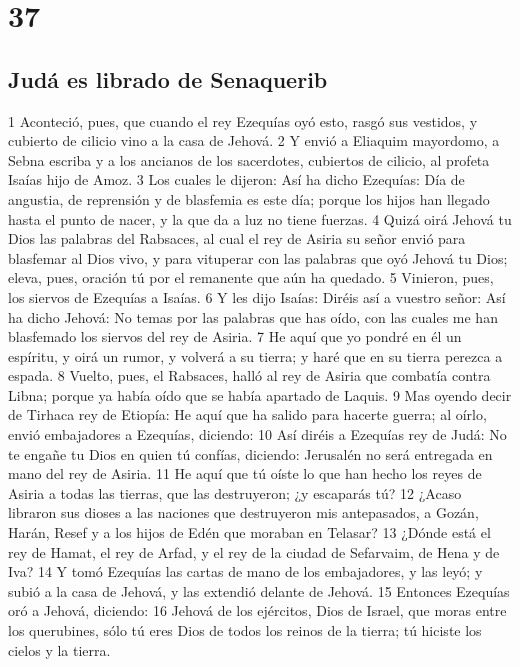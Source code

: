 \chapter{37}

\section*{Judá es librado de Senaquerib}

1 Aconteció, pues, que cuando el rey Ezequías oyó esto, rasgó sus vestidos, y cubierto de cilicio vino a la casa de Jehová.
2 Y envió a Eliaquim mayordomo, a Sebna escriba y a los ancianos de los sacerdotes, cubiertos de cilicio, al profeta Isaías hijo de Amoz.
3 Los cuales le dijeron: Así ha dicho Ezequías: Día de angustia, de reprensión y de blasfemia es este día; porque los hijos han llegado hasta el punto de nacer, y la que da a luz no tiene fuerzas.
4 Quizá oirá Jehová tu Dios las palabras del Rabsaces, al cual el rey de Asiria su señor envió para blasfemar al Dios vivo, y para vituperar con las palabras que oyó Jehová tu Dios; eleva, pues, oración tú por el remanente que aún ha quedado.
5 Vinieron, pues, los siervos de Ezequías a Isaías.
6 Y les dijo Isaías: Diréis así a vuestro señor: Así ha dicho Jehová: No temas por las palabras que has oído, con las cuales me han blasfemado los siervos del rey de Asiria.
7 He aquí que yo pondré en él un espíritu, y oirá un rumor, y volverá a su tierra; y haré que en su tierra perezca a espada.
8 Vuelto, pues, el Rabsaces, halló al rey de Asiria que combatía contra Libna; porque ya había oído que se había apartado de Laquis.
9 Mas oyendo decir de Tirhaca rey de Etiopía: He aquí que ha salido para hacerte guerra; al oírlo, envió embajadores a Ezequías, diciendo:
10 Así diréis a Ezequías rey de Judá: No te engañe tu Dios en quien tú confías, diciendo: Jerusalén no será entregada en mano del rey de Asiria.
11 He aquí que tú oíste lo que han hecho los reyes de Asiria a todas las tierras, que las destruyeron; ¿y escaparás tú?
12 ¿Acaso libraron sus dioses a las naciones que destruyeron mis antepasados, a Gozán, Harán, Resef y a los hijos de Edén que moraban en Telasar?
13 ¿Dónde está el rey de Hamat, el rey de Arfad, y el rey de la ciudad de Sefarvaim, de Hena y de Iva?
14 Y tomó Ezequías las cartas de mano de los embajadores, y las leyó; y subió a la casa de Jehová, y las extendió delante de Jehová. 
15 Entonces Ezequías oró a Jehová, diciendo:
16 Jehová de los ejércitos, Dios de Israel, que moras entre los querubines, sólo tú eres Dios de todos los reinos de la tierra; tú hiciste los cielos y la tierra.
